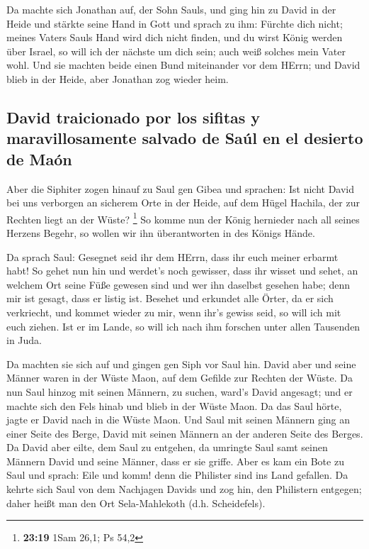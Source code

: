 Da machte sich Jonathan auf, der Sohn Sauls, und ging
hin zu David in der Heide und stärkte seine Hand in Gott 
und sprach zu ihm: Fürchte dich nicht; meines Vaters Sauls Hand wird
dich nicht finden, und du wirst König werden über Israel, so will ich
der nächste um dich sein; auch weiß solches mein Vater wohl.
 Und sie machten beide einen Bund miteinander vor dem
HErrn; und David blieb in der Heide, aber Jonathan zog wieder heim.

\hypertarget{david-traicionado-por-los-sifitas-y-maravillosamente-salvado-de-sauxfal-en-el-desierto-de-mauxf3n}{%
\subsection{David traicionado por los sifitas y maravillosamente salvado
de Saúl en el desierto de
Maón}\label{david-traicionado-por-los-sifitas-y-maravillosamente-salvado-de-sauxfal-en-el-desierto-de-mauxf3n}}

 Aber die Siphiter zogen hinauf zu Saul gen Gibea und
sprachen: Ist nicht David bei uns verborgen an sicherem Orte in der
Heide, auf dem Hügel Hachila, der zur Rechten liegt an der Wüste?
\footnote{\textbf{23:19} 1Sam 26,1; Ps 54,2}  So komme
nun der König hernieder nach all seines Herzens Begehr, so wollen wir
ihn überantworten in des Königs Hände.

 Da sprach Saul: Gesegnet seid ihr dem HErrn, dass ihr
euch meiner erbarmt habt!  So gehet nun hin und werdet's
noch gewisser, dass ihr wisset und sehet, an welchem Ort seine Füße
gewesen sind und wer ihn daselbst gesehen habe; denn mir ist gesagt,
dass er listig ist.  Besehet und erkundet alle Örter, da
er sich verkriecht, und kommet wieder zu mir, wenn ihr's gewiss seid, so
will ich mit euch ziehen. Ist er im Lande, so will ich nach ihm forschen
unter allen Tausenden in Juda.

 Da machten sie sich auf und gingen gen Siph vor Saul
hin. David aber und seine Männer waren in der Wüste Maon, auf dem
Gefilde zur Rechten der Wüste.  Da nun Saul hinzog mit
seinen Männern, zu suchen, ward's David angesagt; und er machte sich den
Fels hinab und blieb in der Wüste Maon. Da das Saul hörte, jagte er
David nach in die Wüste Maon.  Und Saul mit seinen
Männern ging an einer Seite des Berge, David mit seinen Männern an der
anderen Seite des Berges. Da David aber eilte, dem Saul zu entgehen, da
umringte Saul samt seinen Männern David und seine Männer, dass er sie
griffe.  Aber es kam ein Bote zu Saul und sprach: Eile
und komm! denn die Philister sind ins Land gefallen.  Da
kehrte sich Saul von dem Nachjagen Davids und zog hin, den Philistern
entgegen; daher heißt man den Ort Sela-Mahlekoth (d.h. Scheidefels).

